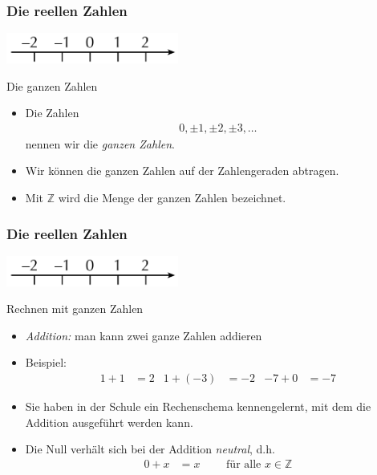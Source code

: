 \documentclass{beamer}
\title[Annuma]{\mytitle}
\author[Amin Coja-Oghlan]{Amin Coja-Oghlan}
\institute[Frankfurt]{JWGUFFM}
\date{}
\renewcommand{\emph}[1]{{\textcolor{solarizedRed}{\itshape #1}}}
\newcommand\ZZ{\mathbb Z}
\renewcommand{\ae}{\"a}
\renewcommand{\oe}{\"o}
\newcommand{\ue}{\"u}
\newcommand{\mytitle}{Die reellen Zahlen}
\begin{document}
\frame[plain]{\titlepage}

\begin{frame}\frametitle{\mytitle}
	\hfill\includegraphics[height=10mm]{pics/integers.pdf}
	\begin{block}{Die ganzen Zahlen}
		\begin{itemize}
			\item Die Zahlen
				\begin{align*}
				0,\pm1,\pm2,\pm3,\ldots
				\end{align*}
				nennen wir die {\em ganzen Zahlen}.
			\item Wir k\oe nnen die ganzen Zahlen auf der Zahlengeraden abtragen.
			\item Mit $\ZZ$ wird die Menge der ganzen Zahlen bezeichnet.
		\end{itemize}
	\end{block}
\end{frame}

\begin{frame}\frametitle{\mytitle}
	\hfill\includegraphics[height=10mm]{pics/integers.pdf}
	\begin{block}{Rechnen mit ganzen Zahlen}
		\begin{itemize}
			\item \emph{Addition:} man kann zwei ganze Zahlen addieren
			\item Beispiel:
				\begin{align*}
					1+1&=2&1+(-3)&=-2&-7+0&=-7
				\end{align*}
			\item Sie haben in der Schule ein Rechenschema kennengelernt, mit dem die Addition ausgef\ue hrt werden kann.
			\item Die Null verh\ae lt sich bei der Addition \emph{neutral}, d.h.\
				\begin{align*}
					0+x&=x\qquad\mbox{ f\ue r alle }x\in\ZZ
				\end{align*}
		\end{itemize}
	\end{block}
\end{frame}
\end{document}
